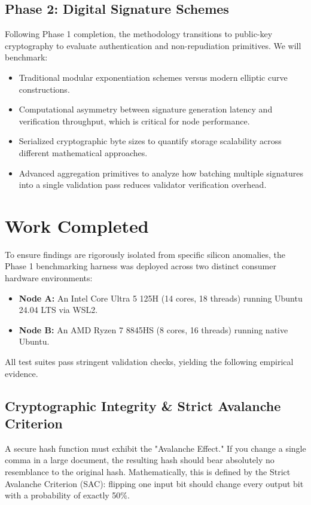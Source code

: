 \documentclass[11pt,a4paper,oneside]{book}
\begin{document}
\section{Phase 2: Digital Signature Schemes}
Following Phase 1 completion, the methodology transitions to public-key cryptography to evaluate authentication and non-repudiation primitives. We will benchmark:
\begin{itemize}
    \item Traditional modular exponentiation schemes versus modern elliptic curve constructions.
    \item Computational asymmetry between signature generation latency and verification throughput, which is critical for node performance.
    \item Serialized cryptographic byte sizes to quantify storage scalability across different mathematical approaches.
    \item Advanced aggregation primitives to analyze how batching multiple signatures into a single validation pass reduces validator verification overhead.
\end{itemize}


\chapter{Work Completed}

To ensure findings are rigorously isolated from specific silicon anomalies, the Phase 1 benchmarking harness was deployed across two distinct consumer hardware environments:
\begin{itemize}
    \item \textbf{Node A:} An Intel Core Ultra 5 125H (14 cores, 18 threads) running Ubuntu 24.04 LTS via WSL2.
    \item \textbf{Node B:} An AMD Ryzen 7 8845HS (8 cores, 16 threads) running native Ubuntu.
\end{itemize}
All test suites pass stringent validation checks, yielding the following empirical evidence.

\section{Cryptographic Integrity \& Strict Avalanche Criterion}
A secure hash function must exhibit the "Avalanche Effect." If you change a single comma in a large document, the resulting hash should bear absolutely no resemblance to the original hash. Mathematically, this is defined by the Strict Avalanche Criterion (SAC): flipping one input bit should change every output bit with a probability of exactly 50\%.
\end{document}

